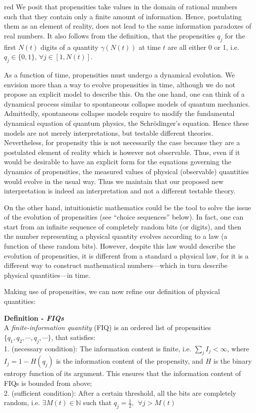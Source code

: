 \documentclass[12pt]{article}
\newcommand{\N}{\mathbb{N}}
\begin{document}
{red}{ We posit that propensities take values in the domain of rational numbers such that they contain only a finite amount of information. Hence, postulating them as an element of reality, does not lead to the same information paradoxes of real numbers.} It also follows from the definition, that the propensities $q_j$ for the first $N(t)$ digits of a quantity $\gamma(N(t))$ at time $t$ are all either 0 or 1, i.e. $q_j\in\{0,1\}$, $\forall j\in[1,N(t)]$.

As a function of time, propensities must undergo a dynamical evolution. We envision more than a way to evolve propensities in time, although we do not propose an explicit model to describe this. On the one hand, one can think of a dynamical process similar to spontaneous collapse models of quantum mechanics. Admittedly, spontaneous collapse models require to modify the fundamental dynamical equation of quantum physics, the Schr{\"o}dinger's equation. Hence these models are not merely interpretations, but testable different theories. Nevertheless, for propensity this is not necessarily the case because they are a postulated element of reality which is however not observable. Thus, even if it would be desirable to have an explicit form for the equations governing the dynamics of propensities, the measured values of physical (observable) quantities would evolve in the usual way. Thus we maintain that our proposed new interpretation is indeed an interpretation and not a different testable theory.

On the other hand, intuitionistic mathematics could be the tool to solve the issue of the evolution of propensities (see ``choice sequences'' below). In fact, one can start from an infinite sequence of completely random bits (or digits), and then the number representing a physical quantity evolves according to a law (a function of these random bits). However, despite this law would describe the evolution of propensities, it is different from a standard a physical law, for it is a different way to construct mathematical numbers---which in turn describe physical quantities---in time.

Making use of propensities, we can now refine our definition of physical quantities:

\textbf{Definition - \textit{FIQs}}\\
A \emph{finite-information quantity} (FIQ) is an ordered list of propensities $\{ q_1, q_2, \cdots , q_j, \cdots \}$, that satisfies:\\
1. (necessary condition): The information content is finite, i.e.  $\sum_j I_j < \infty$, where $I_j=1-H(q_j)$ is the information content of the propensity, and $H$ is the binary entropy function of its argument. This ensures that the information content of FIQs is bounded from above;\\
2. (sufficient condition): After a certain threshold, all the bits are completely random, i.e. $\exists M(t) \in \N$ such that $q_j = \frac{1}{2}, \ \ \forall j>M(t)$\\
\end{document}
